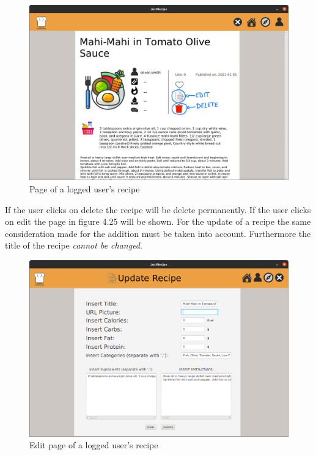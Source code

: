 \documentclass[a4paper]{report}
\begin{document}
\begin{figure}[htpb]
	\centering
	\includegraphics[scale=0.3]{img/user_manual/pageOfMyRecipe.png}
	\caption{Page of a logged user's recipe}
\end{figure}

\noindent If the user clicks on delete the recipe will be delete permanently. If the user clicks on edit the page in figure 4.25 will be shown. For the update of a recipe the same consideration made for the addition must be taken into account. Furthermore the title of the recipe \emph{cannot be changed}.


\begin{figure}[htpb]
	\centering
	\includegraphics[scale=0.3]{img/user_manual/editRecipe.png}
	\caption{Edit page of a logged user's recipe}
\end{figure}
\end{document}
